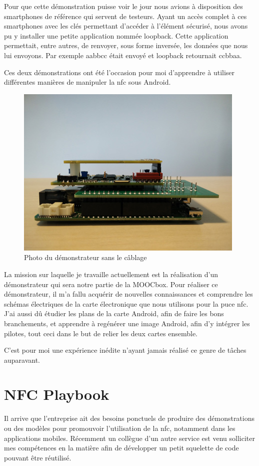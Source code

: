 \documentclass[french,12pt,a4paper,titlepage,openright,openbib]{report}
\begin{document}
Pour que cette démonstration puisse voir le jour nous avions à disposition des smartphones de référence qui servent de testeurs. Ayant un accès complet à ces smartphones avec les clés permettant d'accéder à l'élément sécurisé, nous avons pu y installer une petite application nommée loopback. Cette application permettait, entre autres, de renvoyer, sous forme inversée, les données que nous lui envoyons. Par exemple aabbcc était envoyé et loopback retournait ccbbaa.

Ces deux démonstrations ont été l'occasion pour moi d'apprendre à utiliser différentes manières de manipuler la \gls{nfc} sous Android.
\begin{figure}
	\center
	\includegraphics[]{demonstrateur}
	\caption{Photo du démonstrateur sans le câblage}
\end{figure}
La mission sur laquelle je travaille actuellement est la réalisation d'un démonstrateur qui sera notre partie de la MOOCbox.
Pour réaliser ce démonstrateur, il m'a fallu acquérir de nouvelles connaissances et comprendre les schémas électriques de la carte électronique que nous utilisons pour la puce \gls{nfc}. J'ai aussi dû étudier les plans de la carte Android, afin de faire les bons branchements, et apprendre à regénérer une image Android, afin d’y intégrer les pilotes, tout ceci dans le but de relier les deux cartes ensemble.

C'est pour moi une expérience inédite n'ayant jamais réalisé ce genre de tâches auparavant.

\section{NFC Playbook}
Il arrive que l'entreprise ait des besoins ponctuels de produire des démonstrations ou des modèles pour promouvoir l'utilisation de la \gls{nfc}, notamment dans les applications mobiles.
Récemment un collègue d'un autre service est venu solliciter mes compétences en la matière afin de développer un petit squelette de code pouvant être réutilisé.
\end{document}
